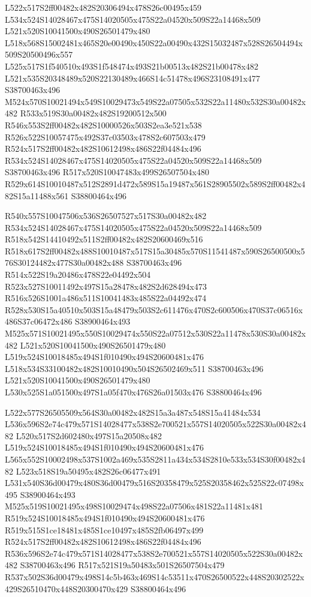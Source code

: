 \documentclass{article}
\begin{document}
\begin{multicols}{2}
L522x517S2ff00482x482S20306494x478S26c00495x459 L534x524S14028467x475S14020505x475S22a04520x509S22a14468x509 L521x520S10041500x490S26501479x480 L518x568S15002481x465S20e00490x450S22a00490x432S15032487x528S26504494x509S20500496x557 L525x517S1f540510x493S1f548474x493S21b00513x482S21b00478x482 L521x535S20348489x520S22130489x466S14c51478x496S23108491x477 S38700463x496 M524x570S10021494x549S10029473x549S22a07505x532S22a11480x532S30a00482x482 R533x519S30a00482x482S19200512x500 R546x553S2ff00482x482S10000526x503S2ea3e521x538 R526x522S10057475x492S37c03503x478S2c607503x479 R524x517S2ff00482x482S10612498x486S22f04484x496 R534x524S14028467x475S14020505x475S22a04520x509S22a14468x509 S38700463x496 R517x520S10047483x499S26507504x480 R529x614S10010487x512S2891d472x589S15a19487x561S28905502x589S2ff00482x482S15a11488x561 S38800464x496

R540x557S10047506x536S26507527x517S30a00482x482 R534x524S14028467x475S14020505x475S22a04520x509S22a14468x509 R518x542S14410492x511S2ff00482x482S20600469x516 R518x617S2ff00482x488S10010487x517S15a30485x570S11541487x590S26500500x576S30124482x477S30a00482x488 S38700463x496 R514x522S19a20486x478S22e04492x504 R523x527S10011492x497S15a28478x482S2d628494x473 R516x526S1001a486x511S10041483x485S22a04492x474 R528x530S15a40510x503S15a48479x503S2c611476x470S2c600506x470S37c06516x486S37c06472x486 S38900464x493 M525x571S10021495x550S10029474x550S22a07512x530S22a11478x530S30a00482x482 L521x520S10041500x490S26501479x480 L519x524S10018485x494S1f010490x494S20600481x476 L518x534S33100482x482S10010490x504S26502469x511 S38700463x496 L521x520S10041500x490S26501479x480 L530x525S1a051500x497S1a05f470x476S26a01503x476 S38800464x496

L522x577S26505509x564S30a00482x482S15a3a487x548S15a41484x534 L536x596S2e74c479x571S14028477x538S2e700521x557S14020505x522S30a00482x482 L520x517S2d602480x497S15a20508x482 L519x524S10018485x494S1f010490x494S20600481x476 L565x552S10002498x537S1002a469x535S2811a434x534S2810e533x534S30f00482x482 L523x518S19a50495x482S26c06477x491 L531x540S36d00479x480S36d00479x516S20358479x525S20358462x525S22c07498x495 S38900464x493 M525x519S10021495x498S10029474x498S22a07506x481S22a11481x481 R519x524S10018485x494S1f010490x494S20600481x476 R519x515S1ce18481x485S1ce10497x485S2fb06497x499 R524x517S2ff00482x482S10612498x486S22f04484x496 R536x596S2e74c479x571S14028477x538S2e700521x557S14020505x522S30a00482x482 S38700463x496 R517x521S19a50483x501S26507504x479 R537x502S36d00479x498S14c5b463x469S14c53511x470S26500522x448S20302522x429S26510470x448S20300470x429 S38800464x496


\end{multicols}
\end{document}
